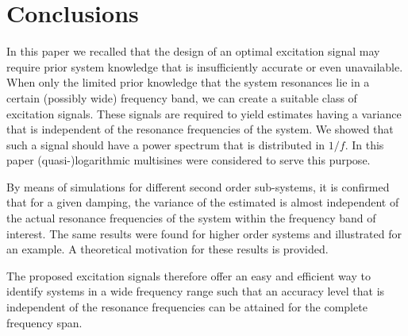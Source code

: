 %   

%   


\section{Conclusions}\label{sec:excitation:conclusions}
In this paper we recalled that the design of an optimal excitation signal may require prior system knowledge that is insufficiently accurate or even unavailable. 
When only the limited prior knowledge that the system resonances lie in a certain (possibly wide) frequency band, we can create a suitable class of excitation signals. 
These signals are required to yield estimates having a variance that is independent of the resonance frequencies of the system. 
We showed that such a signal should have a power spectrum that is distributed in $1/f$.
In this paper (quasi-)logarithmic multisines were considered to serve this purpose.

By means of simulations for different second order sub-systems, it is confirmed that for a given damping, the variance of the estimated is almost independent of the actual resonance frequencies of the system within the frequency band of interest.
The same results were found for higher order systems and illustrated for an example. 
A theoretical motivation for these results is provided.

The proposed excitation signals therefore offer an easy and efficient way to identify systems in a wide frequency range such that an accuracy level that is independent of the resonance frequencies can be attained for the complete frequency span.
